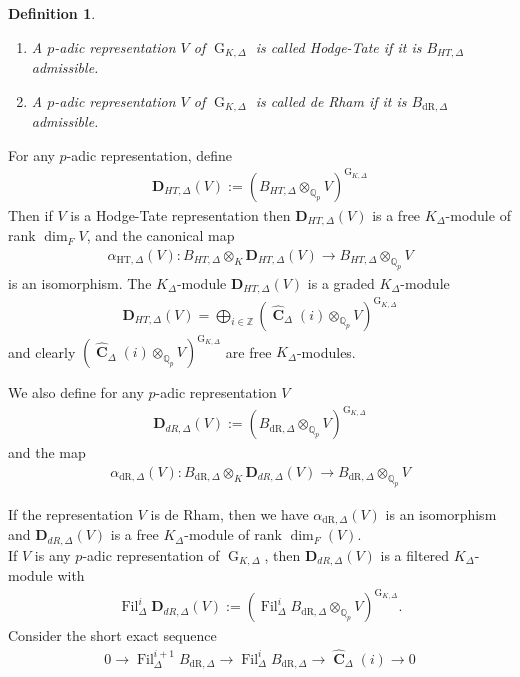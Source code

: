 \documentclass{amsart}
\newtheorem{definition}[proposition]{Definition}
\DeclareMathOperator{\C}{\textbf{C}}
\newcommand{\mBdr}{B_{\mathrm{dR},\Delta}}
\newcommand{\mBHT}{B_{HT,\Delta}}
\newcommand{\mbDHT}{\textbf{D}_{HT,\Delta}}
\newcommand{\mbDdR}{\textbf{D}_{dR,\Delta}}
\DeclareMathOperator{\G}{G}
\DeclareMathOperator{\Fil}{Fil}
\begin{document}
\begin{definition}
   \begin{enumerate}
       \item[(i)] A $p$-adic representation $V$ of $\G_{K,\Delta}$ is called \emph{Hodge-Tate} if it is $\mBHT$ admissible.
       \item[(ii)] A $p$-adic representation $V$ of $\G_{K,\Delta}$ is called \emph{de Rham} if it is $\mBdr$ admissible.
   \end{enumerate}
\end{definition}

For any $p$-adic representation, define 
\begin{align*}
    \mbDHT(V):=(\mBHT\otimes_{\mathbb{Q}_p}V)^{\G_{K,\Delta}}
\end{align*}
Then if $V$ is a Hodge-Tate representation then $\mbDHT(V)$ is a free $K_\Delta$-module of rank $\dim_F V$, and the canonical map
\begin{align*}
    \alpha_{\text{HT},\Delta}(V):\mBHT\otimes_K\mbDHT(V)\to \mBHT\otimes_{\mathbb{Q}_p}V
\end{align*}
is an isomorphism. The $K_\Delta$-module $\mbDHT(V)$ is a graded $K_\Delta$-module
\begin{align*}
    \mbDHT(V)=\bigoplus\limits_{i\in\mathbb{Z}}(\widehat{\C}_\Delta(i)\otimes_{\mathbb{Q}_p}V)^{\G_{K,\Delta}}
\end{align*}
and clearly $(\widehat{\C}_\Delta(i)\otimes_{\mathbb{Q}_p}V)^{\G_{K,\Delta}}$ are free $K_\Delta$-modules.

We also define for any $p$-adic representation $V$
\begin{align*}
    \mbDdR(V):=(\mBdr\otimes_{\mathbb{Q}_p}V)^{\G_{K,\Delta}}
\end{align*}
and the map
\begin{align*}
    \alpha_{\text{dR},\Delta}(V):\mBdr\otimes_K\mbDdR(V)\to \mBdr\otimes_{\mathbb{Q}_p}V
\end{align*}

If the representation $V$ is de Rham, then we have $\alpha_{\text{dR},\Delta}(V)$ is an isomorphism and $\mbDdR(V)$ is a free $K_\Delta$-module of rank $\dim_F(V)$.\\

If $V$ is any $p$-adic representation of $\G_{K,\Delta}$, then $\mbDdR(V)$ is a filtered $K_\Delta$-module with
\begin{align*}
    \Fil^i_\Delta\mbDdR(V):=(\Fil^i_\Delta\mBdr\otimes_{\mathbb{Q}_p}V)^{\G_{K,\Delta}}.
\end{align*}
Consider the short exact sequence
\begin{align*}
    0\to\Fil^{i+1}_\Delta\mBdr\to \Fil^i_\Delta\mBdr\to \widehat{\C}_\Delta(i)\to 0
\end{align*}
\end{document}
